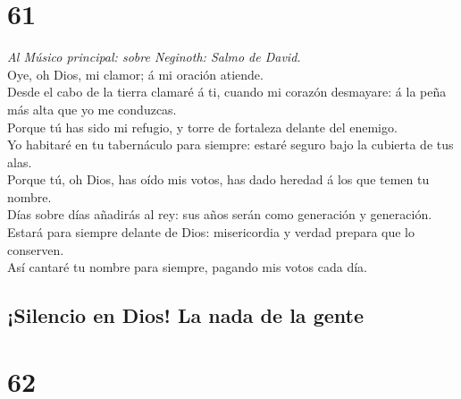 \hypertarget{section-60}{%
\section{61}\label{section-60}}

 \emph{Al Músico principal: sobre Neginoth: Salmo de
David.}\\
Oye, oh Dios, mi clamor; á mi oración atiende.\\
 Desde el cabo de la tierra clamaré á ti, cuando mi corazón
desmayare: á la peña más alta que yo me conduzcas.\\
 Porque tú has sido mi refugio, y torre de fortaleza delante
del enemigo.\\
 Yo habitaré en tu tabernáculo para siempre: estaré seguro
bajo la cubierta de tus alas.\\
 Porque tú, oh Dios, has oído mis votos, has dado heredad á
los que temen tu nombre.\\
 Días sobre días añadirás al rey: sus años serán como
generación y generación.\\
 Estará para siempre delante de Dios: misericordia y verdad
prepara que lo conserven.\\
 Así cantaré tu nombre para siempre, pagando mis votos cada
día.

\hypertarget{silencio-en-dios-la-nada-de-la-gente}{%
\subsection{¡Silencio en Dios! La nada de la
gente}\label{silencio-en-dios-la-nada-de-la-gente}}

\hypertarget{section-61}{%
\section{62}\label{section-61}}

